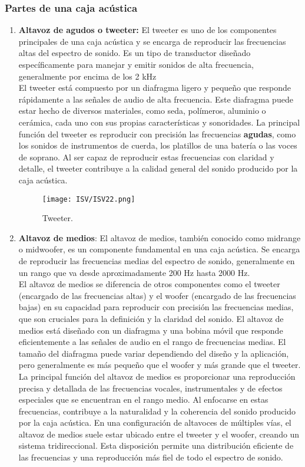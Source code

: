 \documentclass[
	12pt, %
	fleqn, %
	a4paper, %
	oneside, %
]{LegrandOrangeBook}
\begin{document}
\subsubsection{Partes de una caja acústica}
\begin{enumerate}
\item \textbf{Altavoz de agudos o tweeter:} El tweeter es uno de los componentes principales de una caja acústica y se encarga de reproducir las frecuencias altas del espectro de sonido. Es un tipo de transductor diseñado específicamente para manejar y emitir sonidos de alta frecuencia, generalmente por encima de los 2 kHz\\
El tweeter está compuesto por un diafragma ligero y pequeño que responde rápidamente a las señales de audio de alta frecuencia. Este diafragma puede estar hecho de diversos materiales, como seda, polímeros, aluminio o cerámica, cada uno con sus propias características y sonoridades. La principal función del tweeter es reproducir con precisión las frecuencias \textbf{agudas}, como los sonidos de instrumentos de cuerda, los platillos de una batería o las voces de soprano. Al ser capaz de reproducir estas frecuencias con claridad y detalle, el tweeter contribuye a la calidad general del sonido producido por la caja acústica.
\begin{figure}[H]
\centering
\texttt{[image: ISV/ISV22.png]}
\caption{Tweeter.}
\end{figure}
\item \textbf{Altavoz de medios}: El altavoz de medios, también conocido como midrange o midwoofer, es un componente fundamental en una caja acústica. Se encarga de reproducir las frecuencias medias del espectro de sonido, generalmente en un rango que va desde aproximadamente 200 Hz hasta 2000 Hz.\\
El altavoz de medios se diferencia de otros componentes como el tweeter (encargado de las frecuencias altas) y el woofer (encargado de las frecuencias bajas) en su capacidad para reproducir con precisión las frecuencias medias, que son cruciales para la definición y la claridad del sonido. El altavoz de medios está diseñado con un diafragma y una bobina móvil que responde eficientemente a las señales de audio en el rango de frecuencias medias. El tamaño del diafragma puede variar dependiendo del diseño y la aplicación, pero generalmente es más pequeño que el woofer y más grande que el tweeter. La principal función del altavoz de medios es proporcionar una reproducción precisa y detallada de las frecuencias vocales, instrumentales y de efectos especiales que se encuentran en el rango medio. Al enfocarse en estas frecuencias, contribuye a la naturalidad y la coherencia del sonido producido por la caja acústica. En una configuración de altavoces de múltiples vías, el altavoz de medios suele estar ubicado entre el tweeter y el woofer, creando un sistema tridireccional. Esta disposición permite una distribución eficiente de las frecuencias y una reproducción más fiel de todo el espectro de sonido. 

\end{enumerate}
\end{document}
